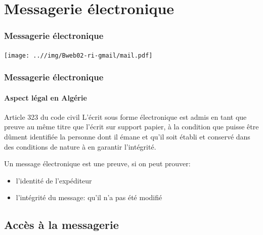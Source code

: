 \documentclass{beamer}
\begin{document}
\section{Messagerie électronique}

\begin{frame}
\frametitle{Messagerie électronique}

\begin{center}
	\texttt{[image: ..//img/Bweb02-ri-gmail/mail.pdf]}
\end{center}

\end{frame}

\begin{frame}
\frametitle{Messagerie électronique}
\framesubtitle{Aspect légal en Algérie}


\begin{block}{Article 323 du code civil}
	L'écrit sous forme électronique est admis en tant que preuve au même titre que l'écrit sur support papier, à la condition que puisse être dûment identifiée la personne dont il émane et qu’il soit établi et conservé dans des conditions de nature à en garantir l'intégrité.
\end{block}

Un message électronique est une preuve, si on peut prouver: 
\begin{itemize}
	\item l'identité de l'expéditeur 
	\item l'intégrité du message: qu'il n'a pas été modifié 
\end{itemize} 

\end{frame}

\subsection{Accès à la messagerie}
\end{document}
